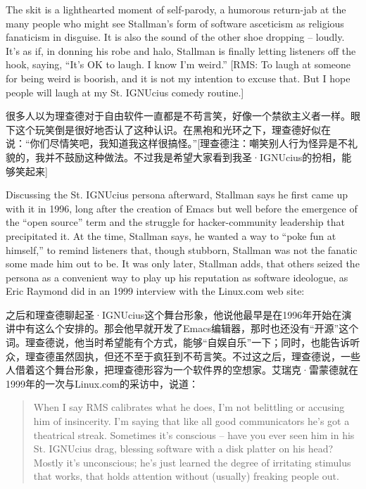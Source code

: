 \ifdefined\eng
The skit is a lighthearted moment of self-parody, a humorous return-jab at the many people who might see Stallman's form of software asceticism as religious fanaticism in disguise. It is also the sound of the other shoe dropping -- loudly. It's as if, in donning his robe and halo, Stallman is finally letting listeners off the hook, saying, ``It's OK to laugh. I know I'm weird.''  [RMS: To laugh at someone for being weird is boorish, and it is not my intention to excuse that.  But I hope people will laugh at my St. IGNUcius comedy routine.]
\fi

\ifdefined\chs
很多人以为理查德对于自由软件一直都是不苟言笑，好像一个禁欲主义者一样。眼下这个玩笑倒是很好地否认了这种认识。在黑袍和光环之下，理查德好似在说：“你们尽情笑吧，我知道我这样很搞怪。”[理查德注：嘲笑别人行为怪异是不礼貌的，我并不鼓励这种做法。不过我是希望大家看到我圣·IGNUcius的扮相，能够笑起来]
\fi

\ifdefined\eng
Discussing the St. IGNUcius persona afterward, Stallman says he first came up with it in 1996, long after the creation of Emacs but well before the emergence of the ``open source'' term and the struggle for hacker-community leadership that precipitated it. At the time, Stallman says, he wanted a way to ``poke fun at himself,'' to remind listeners that, though stubborn, Stallman was not the fanatic some made him out to be. It was only later, Stallman adds, that others seized the persona as a convenient way to play up his reputation as software ideologue, as Eric Raymond did in an 1999 interview with the Linux.com web site:
\fi

\ifdefined\chs
之后和理查德聊起圣·IGNUcius这个舞台形象，他说他最早是在1996年开始在演讲中有这么个安排的。那会他早就开发了Emacs编辑器，那时也还没有“开源”这个词。理查德说，他当时希望能有个方式，能够“自娱自乐”一下；同时，也能告诉听众，理查德虽然固执，但还不至于疯狂到不苟言笑。不过这之后，理查德说，一些人借着这个舞台形象，把理查德形容为一个软件界的空想家。艾瑞克·雷蒙德就在1999年的一次与Linux.com的采访中，说道：
\fi

\ifdefined\eng
\begin{quote}
When I say RMS calibrates what he does, I'm not belittling or accusing him of insincerity. I'm saying that like all good communicators he's got a theatrical streak. Sometimes it's conscious -- have you ever seen him in his St. IGNUcius drag, blessing software with a disk platter on his head? Mostly it's unconscious; he's just learned the degree of irritating stimulus that works, that holds attention without (usually) freaking people out.
\end{quote}
\fi

